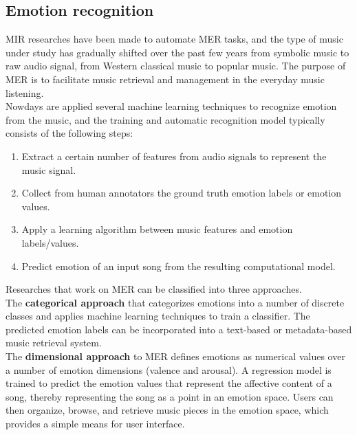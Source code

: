 \subsection{Emotion recognition}
MIR researches have been made to automate MER tasks, and the type of music under study has gradually shifted over the past few years from symbolic music to raw audio signal, from Western classical music to popular music. The purpose of MER is to facilitate music retrieval and management in the everyday music listening.
\\ \indent
Nowdays are applied several machine learning techniques to recognize emotion from the music, and the training and automatic recognition model typically consists of the following steps:
\begin{enumerate}
	\item Extract a certain number of features from audio signals to represent the music signal.
	\item Collect from human annotators the ground truth emotion labels or emotion values.
	\item Apply a learning algorithm between music features and emotion labels/values.
	\item Predict emotion of an input song from the resulting computational model.
\end{enumerate}
Researches that work on MER can be classified into three approaches.
\\ \indent
The \textbf{categorical approach} that categorizes emotions into a number of discrete classes and applies machine learning techniques to train a classifier. The predicted emotion labels can be incorporated into a text-based or metadata-based music retrieval system.
\\ \indent
The \textbf{dimensional approach} to MER defines emotions as numerical values over a number of emotion dimensions (valence and arousal). A regression model is trained to predict the emotion values that represent the affective content of a song, thereby representing the song as a point in an emotion space. Users can then organize, browse, and retrieve music pieces in the emotion space, which provides a simple means for user interface.

